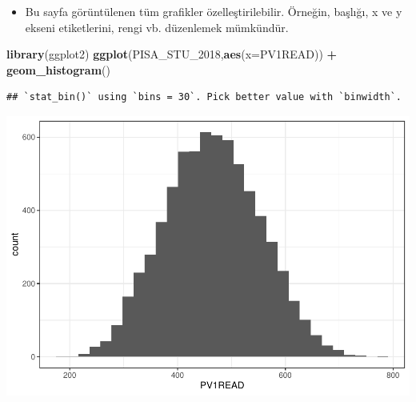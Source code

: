 \documentclass[
  oneside]{book}
\newenvironment{Shaded}{\begin{snugshade}}{\end{snugshade}}
\newcommand{\AttributeTok}[1]{\textcolor[rgb]{0.13,0.29,0.53}{#1}}
\newcommand{\FunctionTok}[1]{\textcolor[rgb]{0.13,0.29,0.53}{\textbf{#1}}}
\newcommand{\NormalTok}[1]{#1}
\newcommand{\SpecialCharTok}[1]{\textcolor[rgb]{0.81,0.36,0.00}{\textbf{#1}}}
\providecommand{\tightlist}{%
  \setlength{\itemsep}{0pt}\setlength{\parskip}{0pt}}
\begin{document}
\begin{itemize}
\tightlist
\item
  Bu sayfa görüntülenen tüm grafikler özelleştirilebilir. Örneğin, başlığı, x ve y ekseni etiketlerini, rengi vb. düzenlemek mümkündür.
\end{itemize}

\begin{Shaded}
\begin{Highlighting}[]
\FunctionTok{library}\NormalTok{(ggplot2)}
\FunctionTok{ggplot}\NormalTok{(PISA\_STU\_2018,}\FunctionTok{aes}\NormalTok{(}\AttributeTok{x=}\NormalTok{PV1READ)) }\SpecialCharTok{+} \FunctionTok{geom\_histogram}\NormalTok{()}
\end{Highlighting}
\end{Shaded}

\begin{verbatim}
## `stat_bin()` using `bins = 30`. Pick better value with `binwidth`.
\end{verbatim}

\begin{center}\includegraphics[width=1\linewidth]{15-betimleyici-istatistik_files/figure-latex/unnamed-chunk-24-1} \end{center}
\end{document}
